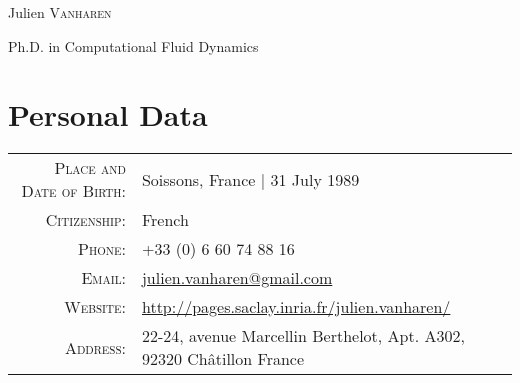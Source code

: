 \documentclass[a4paper,10pt]{article}
\begin{document}
\pagestyle{empty}
\par{\begin{center}
        {\Huge Julien \textsc{Vanharen}}
        \smallskip\par{\Large Ph.D. in Computational Fluid Dynamics} \end{center}}
\smallskip\par

\section{Personal Data}
\begin{tabular}{rl}
    \textsc{Place and Date of Birth:} & Soissons, France | 31 July 1989                                        \\
    \textsc{Citizenship:}             & French                                                                 \\
    \textsc{Phone:}                   & +33 (0) 6 60 74 88 16                                                  \\
    \textsc{Email:}                   & \href{mailto:julien.vanharen@gmail.com}{julien.vanharen@gmail.com}     \\
    \textsc{Website:}                 & \url{http://pages.saclay.inria.fr/julien.vanharen/}                    \\
    \textsc{Address:}                 & 22-24, avenue Marcellin Berthelot, Apt. A302, 92320 Ch\^atillon France \\
\end{tabular}
\end{document}

